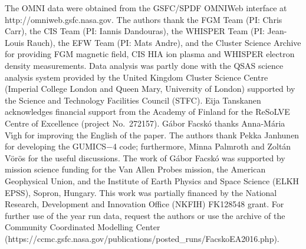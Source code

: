 \documentclass[draft]{agujournal2019}
\begin{document}
\acknowledgments
The OMNI data were obtained from the GSFC/SPDF OMNIWeb interface at http://omniweb.gsfc.nasa.gov. The authors thank the FGM Team (PI: Chris Carr), the CIS Team (PI: Iannis Dandouras), the WHISPER Team (PI: Jean-Louis Rauch), the EFW Team (PI: Mats Andre), and the Cluster Science Archive for providing FGM magnetic field, CIS HIA ion plasma and WHISPER electron density measurements. Data analysis was partly done with the QSAS science analysis system provided by the United Kingdom Cluster Science Centre (Imperial College London and Queen Mary, University of London) supported by the Science and Technology Facilities Council (STFC). Eija Tanskanen acknowledges financial support from the Academy of Finland for the ReSoLVE Centre of Excellence (project No.~272157). G{\'a}bor Facsk{\'o} thanks Anna-M\'aria V{\'\i{}}gh for improving the English of the paper. The authors thank Pekka Janhunen for developing the GUMICS$-$4 code; furthermore, Minna Palmroth and Zolt{\'a}n V{\"o}r{\"o}s for the useful discussions. The work of G{\'a}bor Facsk{\'o} was supported by mission science funding for the Van Allen Probes mission, the American Geophysical Union, and the Institute of Earth Physics and Space Science (ELKH EPSS), Sopron, Hungary. This work was partially financed by the National Research, Development and Innovation Office (NKFIH) FK128548 grant. For further use of the year run data, request the authors or use the archive of the Community Coordinated Modelling Center (https://ccmc.gsfc.nasa.gov/publications/posted\_runs/FacskoEA2016.php).





\pagebreak
\end{document}
